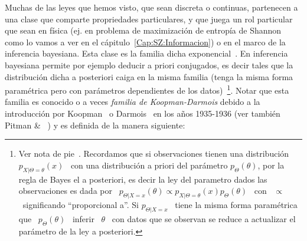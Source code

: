 

Muchas de las leyes que hemos visto, que sean discreta o continuas, partenecen a
una clase que comparte propriedades  particulares, y que juega un rol particular
que sean en f\'isica (ej. en problema de maximizaci\'on de entrop\'ia de Shannon
como lo vamos a ver en  el c\'apitulo~\ref{Cap:SZ:Informacion}) o en el marco de
la inferencia bayesiana. Esta clase es la familia dicha exponencial~\cite{Dar35,
  Koo36, And70, LehCas98, IbPer12,  Muk00, KotBal00, Rob07, Bos07, Cen82, Kay93,
  NieNoc10}.   En inferencia  bayesiana  permite por  ejemplo  deducir a  priori
conjugados, es decir tales que la  distribuci\'on dicha a posteriori caiga en la
misma  familia (\ie  tenga la  misma forma  param\'etrica pero  con par\'ametros
dependientes        de       los       datos)~\footnote{Ver        nota       de
  pie~. Recordamos  que si observaciones  tienen una
  distribuci\'on \  $p_{X|\Theta=\theta}(x)$ \  con una distribuci\'on  a priori
  del par\'ametro $p_\Theta(\theta)$, por la  regla de Bayes el a posteriori, es
  decir  la   ley  del  parametro  dados   las  observaciones  es   dada  por  \
  $p_{\Theta|X=x}(\theta) \propto p_{X|\Theta=\theta}(x) p_\Theta(\theta)$ \ con
  \ $\propto$ \ significando ``proporcional  a''. Si $p_{\Theta|X=x}$ \ tiene la
  misma forma param\'etrica que \  $p_\Theta(\theta)$ \ inferir \ $\theta$ \ con
  datos  que se  observan se  reduce a  actualizar el  par\'ametro de  la  ley a
  posteriori.}. Notar  que esta familia  es conocido o  a veces {\em  familia de
  Koopman-Darmois}  debido  a   la  introducci\'on  por  Koopman~\cite{Koo36}  o
Darmois~\cite{Dar35}  en   los  a\~nos   1935-1936  (ver  tambi\'en   Pitman  \&
~\cite{Pit36}) y es definida de la manera siguiente:
%
